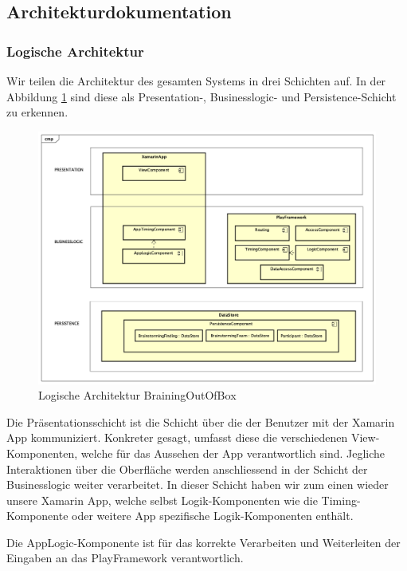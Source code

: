 \subsection{Architekturdokumentation}

\subsubsection{Logische Architektur}
Wir teilen die Architektur des gesamten Systems in drei Schichten auf. In der Abbildung \ref{fig:architektur-methode635} sind diese als Presentation-, Businesslogic- und Persistence-Schicht zu erkennen.

\begin{figure}[h]
	\centering
	\includegraphics[width=1\linewidth]{img/architektur/CD_Methode635}
	\caption{Logische Architektur BrainingOutOfBox}
	\label{fig:architektur-methode635}
\end{figure}

Die Präsentationsschicht ist die Schicht über die der Benutzer mit der Xamarin App kommuniziert. Konkreter gesagt, umfasst diese die verschiedenen View-Komponenten, welche für das Aussehen der App verantwortlich sind. Jegliche Interaktionen über die Oberfläche werden anschliessend in der Schicht der Businesslogic weiter verarbeitet. In dieser Schicht haben wir zum einen wieder unsere Xamarin App, welche selbst Logik-Komponenten wie die Timing-Komponente oder weitere App spezifische Logik-Komponenten enthält.

Die AppLogic-Komponente ist für das korrekte Verarbeiten und Weiterleiten der Eingaben an das PlayFramework verantwortlich.

